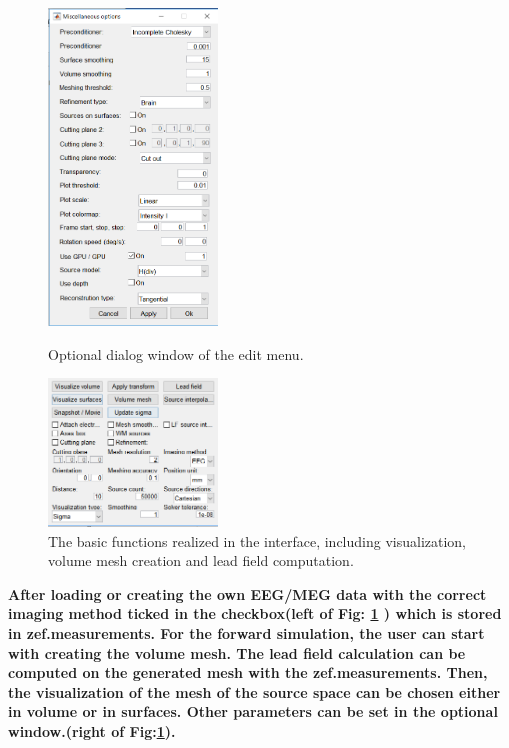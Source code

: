 \documentclass[5p]{elsarticle}
\begin{document}
\begin{frontmatter}
\begin{figure}[h!]
\begin{minipage}
    \begin{center} \includegraphics[width=0.4\textwidth]{additional_option.PNG}
    \end{center}
    \caption{Optional dialog window of the edit menu.}
\end{minipage}
\begin{center}            \includegraphics[width=0.4\textwidth]{forward.PNG}
    \end{center}
    \caption{The basic functions realized in the interface, including visualization, volume mesh creation and lead field computation.}
    \label{fig_5}
\end{figure}

\bf After loading or creating the own EEG/MEG data with the correct imaging method ticked in the checkbox(left of Fig: \ref{fig_5} ) which is stored in zef.measurements. For the forward simulation, the user can start with creating the volume mesh. The lead field calculation can be computed on the generated mesh with the zef.measurements. Then, the visualization of the mesh of the source space can be chosen either in volume or in surfaces. Other parameters can be set in the optional window.(right of Fig:\ref{fig_5}). 


\end{frontmatter}
\end{document}
